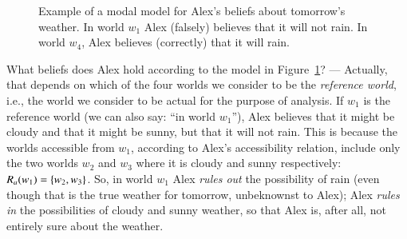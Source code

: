 \documentclass[nobib,nofonts]{tufte-handout}
\begin{document}
\begin{figure}
  \centering
  \caption{Example of a modal model for Alex's beliefs about tomorrow's weather. In world $w_{1}$ Alex (falsely) believes that it will not rain. In world $w_{4}$, Alex believes (correctly) that it will rain.}
  \label{fig:modal-model-single-agent}
\end{figure}

What beliefs does Alex hold according to the model in Figure~\ref{fig:modal-model-single-agent}? ---
Actually, that depends on which of the four worlds we consider to be the \emph{reference world}, i.e., the world we consider to be actual for the purpose of analysis.
If $w_{1}$ is the reference world (we can also say: ``in world $w_{1}$''), Alex believes that it might be cloudy and that it might be sunny, but that it will not rain.
This is because the worlds accessible from $w_{1}$, according to Alex's accessibility relation, include only the two worlds $w_{2}$ and $w_{3}$ where it is cloudy and sunny respectively: $R_{a}(w_{1}) = \left\{w_{2}, w_{3}\right\}$.
So, in world $w_{1}$ Alex \emph{rules out} the possibility of rain (even though that is  the true weather for tomorrow, unbeknownst to Alex); Alex \emph{rules in} the possibilities of cloudy and sunny weather, so that Alex is, after all, not entirely sure about the weather.
\end{document}
